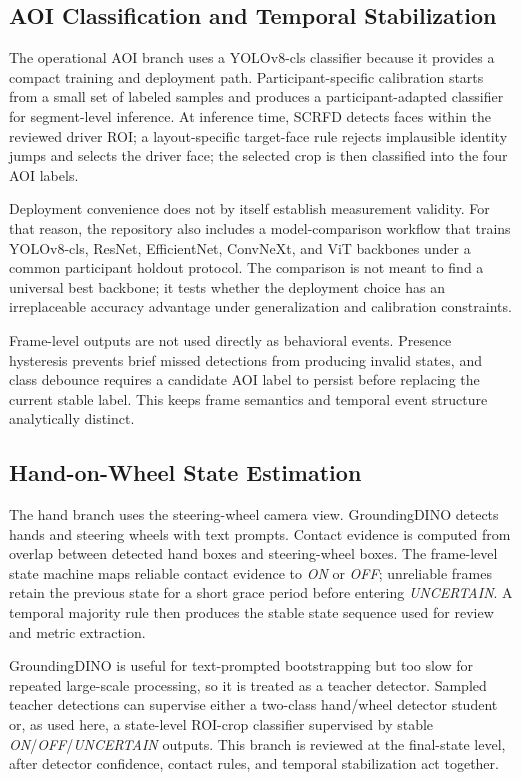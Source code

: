\documentclass[sigconf,review,anonymous]{acmart}
\begin{document}
\subsection{AOI Classification and Temporal Stabilization}

The operational AOI branch uses a YOLOv8-cls classifier because it
provides a compact training and deployment path. Participant-specific
calibration starts from a small set of labeled samples and produces a
participant-adapted classifier for segment-level inference. At inference
time, SCRFD detects faces within the reviewed driver ROI; a
layout-specific target-face rule rejects implausible identity jumps and
selects the driver face; the selected crop is then classified into the
four AOI labels.

Deployment convenience does not by itself establish measurement validity.
For that reason, the repository also includes a model-comparison workflow
that trains YOLOv8-cls, ResNet, EfficientNet, ConvNeXt, and ViT backbones
under a common participant holdout protocol. The comparison is not meant
to find a universal best backbone; it tests whether the deployment choice
has an irreplaceable accuracy advantage under generalization and
calibration constraints.

Frame-level outputs are not used directly as behavioral events. Presence
hysteresis prevents brief missed detections from producing invalid
states, and class debounce requires a candidate AOI label to persist
before replacing the current stable label. This keeps frame semantics and
temporal event structure analytically distinct.

\subsection{Hand-on-Wheel State Estimation}

The hand branch uses the steering-wheel camera view. GroundingDINO
detects hands and steering wheels with text prompts. Contact
evidence is computed from overlap between detected hand boxes and
steering-wheel boxes. The frame-level state machine maps reliable contact
evidence to \textit{ON} or \textit{OFF}; unreliable frames retain the
previous state for a short grace period before entering
\textit{UNCERTAIN}. A temporal majority rule then produces the stable
state sequence used for review and metric extraction.

GroundingDINO is useful for text-prompted bootstrapping but too slow for
repeated large-scale processing, so it is treated as a teacher detector.
Sampled teacher detections can supervise either a two-class hand/wheel
detector student or, as used here, a state-level ROI-crop classifier
supervised by stable \textit{ON}/\textit{OFF}/\textit{UNCERTAIN} outputs.
This branch is reviewed at the final-state level, after detector
confidence, contact rules, and temporal stabilization act together.
\end{document}
